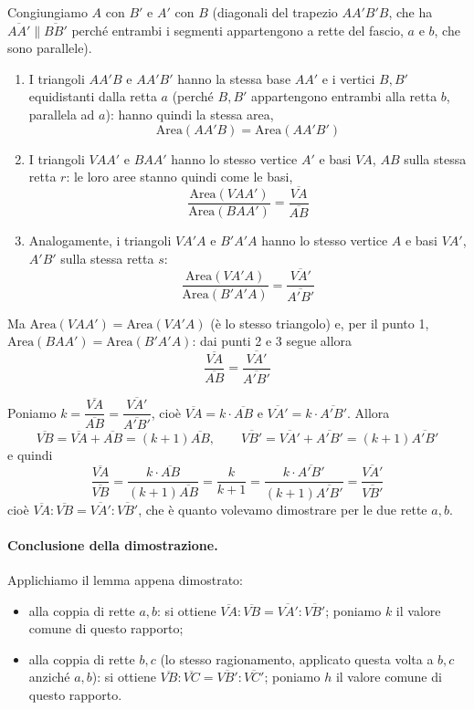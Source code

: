 \documentclass[a4paper,12pt]{article}
\theoremstyle{definition}
\theoremstyle{remark}
\begin{document}
Congiungiamo $A$ con $B'$ e $A'$ con $B$ (diagonali del trapezio $AA'B'B$, che ha $\overline{AA'} \parallel \overline{BB'}$ perché entrambi i segmenti appartengono a rette del fascio, $a$ e $b$, che sono parallele).

\begin{enumerate}
\item I triangoli $AA'B$ e $AA'B'$ hanno la stessa base $AA'$ e i vertici $B,B'$ equidistanti dalla retta $a$ (perché $B, B'$ appartengono entrambi alla retta $b$, parallela ad $a$): hanno quindi la stessa area,
$$\text{Area}(AA'B) = \text{Area}(AA'B')$$
\item I triangoli $VAA'$ e $BAA'$ hanno lo stesso vertice $A'$ e basi $VA$, $AB$ sulla stessa retta $r$: le loro aree stanno quindi come le basi,
$$\frac{\text{Area}(VAA')}{\text{Area}(BAA')} = \frac{\overline{VA}}{\overline{AB}}$$
\item Analogamente, i triangoli $VA'A$ e $B'A'A$ hanno lo stesso vertice $A$ e basi $VA'$, $A'B'$ sulla stessa retta $s$:
$$\frac{\text{Area}(VA'A)}{\text{Area}(B'A'A)} = \frac{\overline{VA'}}{\overline{A'B'}}$$
\end{enumerate}

Ma $\text{Area}(VAA') = \text{Area}(VA'A)$ (è lo stesso triangolo) e, per il punto 1, $\text{Area}(BAA')=\text{Area}(B'A'A)$: dai punti 2 e 3 segue allora
$$\frac{\overline{VA}}{\overline{AB}} = \frac{\overline{VA'}}{\overline{A'B'}}$$

Poniamo $k = \dfrac{\overline{VA}}{\overline{AB}} = \dfrac{\overline{VA'}}{\overline{A'B'}}$, cioè $\overline{VA}=k\cdot\overline{AB}$ e $\overline{VA'}=k\cdot\overline{A'B'}$. Allora
$$\overline{VB}=\overline{VA}+\overline{AB}=(k+1)\overline{AB}, \qquad \overline{VB'}=\overline{VA'}+\overline{A'B'}=(k+1)\overline{A'B'}$$
e quindi
$$\frac{\overline{VA}}{\overline{VB}}=\frac{k\cdot\overline{AB}}{(k+1)\overline{AB}}=\frac{k}{k+1}=\frac{k\cdot\overline{A'B'}}{(k+1)\overline{A'B'}}=\frac{\overline{VA'}}{\overline{VB'}}$$
cioè $\overline{VA}:\overline{VB}=\overline{VA'}:\overline{VB'}$, che è quanto volevamo dimostrare per le due rette $a,b$.

\paragraph{Conclusione della dimostrazione.} Applichiamo il lemma appena dimostrato:
\begin{itemize}
    \item alla coppia di rette $a,b$: si ottiene $\overline{VA}:\overline{VB} = \overline{VA'}:\overline{VB'}$; poniamo $k$ il valore comune di questo rapporto;
    \item alla coppia di rette $b,c$ (lo stesso ragionamento, applicato questa volta a $b,c$ anziché $a,b$): si ottiene $\overline{VB}:\overline{VC} = \overline{VB'}:\overline{VC'}$; poniamo $h$ il valore comune di questo rapporto.
\end{itemize}
\end{document}

